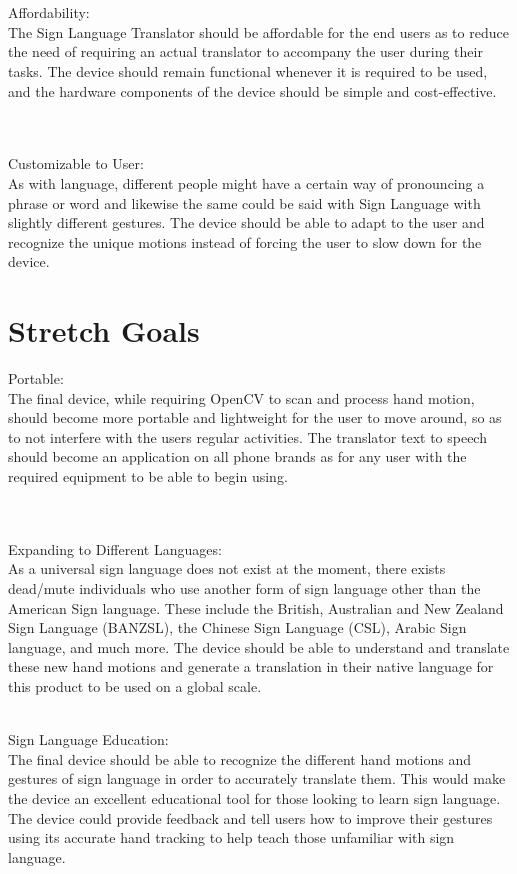 \documentclass{article}
\begin{document}
\\
\\Affordability:\\
The Sign Language Translator should be affordable for the end users as to reduce the need of requiring an actual translator 
to accompany the user during their tasks. The device should remain functional whenever it is required to be used, and the hardware components
 of the device should be simple and cost-effective.

\\
\\Customizable to User:\\
As with language, different people might have a certain way of pronouncing a phrase or word and likewise the same could be said with Sign Language 
with slightly different gestures. The device should be able to adapt to the user and recognize the unique motions instead of forcing the user to 
slow down for the device. 

\section{Stretch Goals}

Portable:\\
The final device, while requiring OpenCV to scan and process hand motion, should become more portable and lightweight for the user
to move around, so as to not interfere with the user\textquotesingle s regular activities. The translator text to speech should
become an application on all phone brands as for any user with the required equipment to be able to begin using.

\\
\\Expanding to Different Languages:\\
As a universal sign language does not exist at the moment, there exists dead/mute individuals who use another form of sign language
other than the American Sign language. These include the British, Australian and New Zealand Sign Language (BANZSL), the Chinese Sign
Language (CSL), Arabic Sign language, and much more. The device should be able to understand and translate these new hand motions and
generate a translation in their native language for this product to be used on a global scale.

\newline
\\Sign Language Education:\\
The final device should be able to recognize the different hand motions and gestures of sign language in order to accurately 
translate them. This would make the device an excellent educational tool for those looking to learn sign language. The device could 
provide feedback and tell users how to improve their gestures using it\textquotesingle s accurate hand tracking to help teach those unfamiliar with 
sign language.
\end{document}
